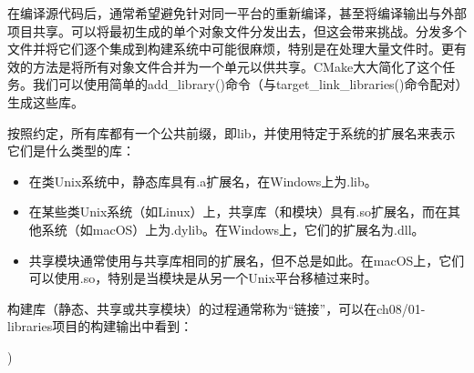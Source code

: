 
在编译源代码后，通常希望避免针对同一平台的重新编译，甚至将编译输出与外部项目共享。可以将最初生成的单个对象文件分发出去，但这会带来挑战。分发多个文件并将它们逐个集成到构建系统中可能很麻烦，特别是在处理大量文件时。更有效的方法是将所有对象文件合并为一个单元以供共享。CMake大大简化了这个任务。我们可以使用简单的add\_library()命令（与target\_link\_libraries()命令配对）生成这些库。

按照约定，所有库都有一个公共前缀，即lib，并使用特定于系统的扩展名来表示它们是什么类型的库：

\begin{itemize}
\item
在类Unix系统中，静态库具有.a扩展名，在Windows上为.lib。

\item
在某些类Unix系统（如Linux）上，共享库（和模块）具有.so扩展名，而在其他系统（如macOS）上为.dylib。在Windows上，它们的扩展名为.dll。

\item
共享模块通常使用与共享库相同的扩展名，但不总是如此。在macOS上，它们可以使用.so，特别是当模块是从另一个Unix平台移植过来时。
\end{itemize}

构建库（静态、共享或共享模块）的过程通常称为“链接”，可以在ch08/01-libraries项目的构建输出中看到：

)
\end{shell}

